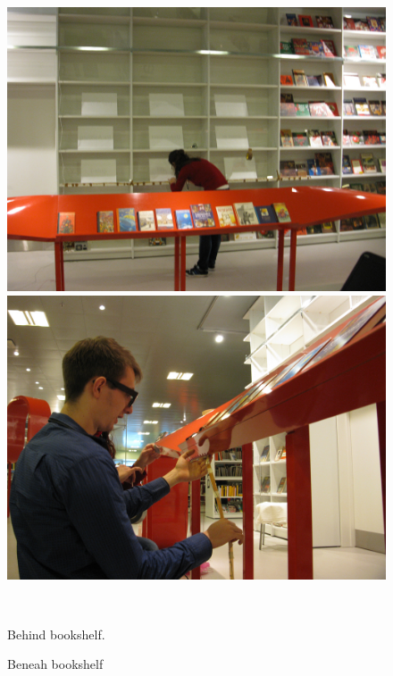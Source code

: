 \begin{figure}[htbp] \centering
\begin{minipage}[b]{0.45\textwidth} \centering
\includegraphics[width=1.00\textwidth]{Pictures/Design/behindShelf} %
\end{minipage} \hfill
\begin{minipage}[b]{0.45\textwidth} \centering
\includegraphics[width=1.00\textwidth]{Pictures/Design/frontShelf} %
\end{minipage} \\ %
\begin{minipage}[t]{0.45\textwidth}
\caption{Behind bookshelf.} %
\label{fig:behindShelf}
\end{minipage} \hfill
\begin{minipage}[t]{0.45\textwidth}
\caption{Beneah bookshelf} %
\label{fig:frontShelf}
\end{minipage}
\end{figure}

